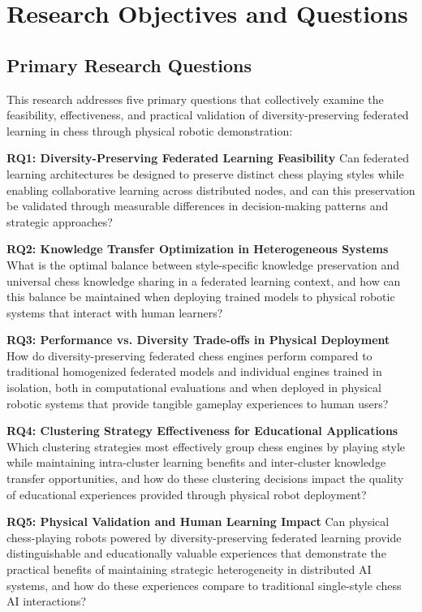 \section{Research Objectives and Questions}
\label{sec:objectives}

\subsection{Primary Research Questions}
\label{subsec:primary-questions}

This research addresses five primary questions that collectively examine the feasibility, effectiveness, and practical validation of diversity-preserving federated learning in chess through physical robotic demonstration:

\textbf{RQ1: Diversity-Preserving Federated Learning Feasibility}
Can federated learning architectures be designed to preserve distinct chess playing styles while enabling collaborative learning across distributed nodes, and can this preservation be validated through measurable differences in decision-making patterns and strategic approaches?

\textbf{RQ2: Knowledge Transfer Optimization in Heterogeneous Systems}
What is the optimal balance between style-specific knowledge preservation and universal chess knowledge sharing in a federated learning context, and how can this balance be maintained when deploying trained models to physical robotic systems that interact with human learners?

\textbf{RQ3: Performance vs. Diversity Trade-offs in Physical Deployment}
How do diversity-preserving federated chess engines perform compared to traditional homogenized federated models and individual engines trained in isolation, both in computational evaluations and when deployed in physical robotic systems that provide tangible gameplay experiences to human users?

\textbf{RQ4: Clustering Strategy Effectiveness for Educational Applications}
Which clustering strategies most effectively group chess engines by playing style while maintaining intra-cluster learning benefits and inter-cluster knowledge transfer opportunities, and how do these clustering decisions impact the quality of educational experiences provided through physical robot deployment?

\textbf{RQ5: Physical Validation and Human Learning Impact}
Can physical chess-playing robots powered by diversity-preserving federated learning provide distinguishable and educationally valuable experiences that demonstrate the practical benefits of maintaining strategic heterogeneity in distributed AI systems, and how do these experiences compare to traditional single-style chess AI interactions?

